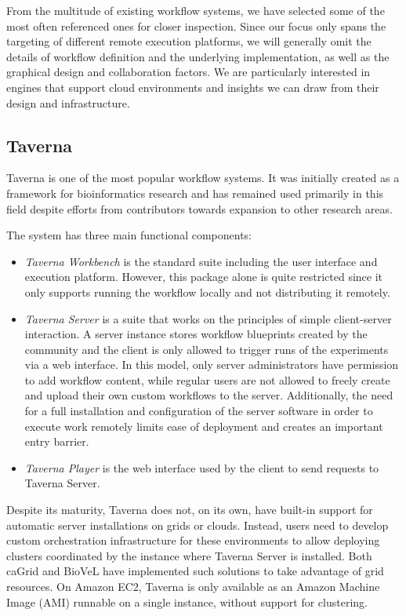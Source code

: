 \documentclass[11pt,a4paper]{report}
\begin{document}
From the multitude of existing workflow systems, we have selected some of the most often referenced ones for closer inspection. Since our focus only spans the targeting of different remote execution platforms, we will generally omit the details of workflow definition and the underlying implementation, as well as the graphical design and collaboration factors. We are particularly interested in engines that support cloud environments and insights we can draw from their design and infrastructure.

\subsection{Taverna}

Taverna \cite{Wolstencroft2013} is one of the most popular workflow systems. It was initially created as a framework for bioinformatics research and has remained used primarily in this field despite efforts from contributors towards expansion to other research areas.

The system has three main functional components:
\begin{itemize}
	\item \textit{Taverna Workbench} is the standard suite including the user interface and execution platform. However, this package alone is quite restricted since it only supports running the workflow locally and not distributing it remotely.
	\item \textit{Taverna Server} is a suite that works on the principles of simple client-server interaction. A server instance stores workflow blueprints created by the community and the client is only allowed to trigger runs of the experiments via a web interface. In this model, only server administrators have permission to add workflow content, while regular users are not allowed to freely create and upload their own custom workflows to the server. Additionally, the need for a full installation and configuration of the server software in order to execute work remotely limits ease of deployment and creates an important entry barrier.
	\item \textit{Taverna Player} is the web interface used by the client to send requests to Taverna Server.
\end{itemize}

Despite its maturity, Taverna does not, on its own, have built-in support for automatic server installations on grids or clouds. Instead, users need to develop custom orchestration infrastructure for these environments to allow deploying clusters coordinated by the instance where Taverna Server is installed. Both caGrid \cite{caGrid} and BioVeL \cite{BioVeL} have implemented such solutions \cite{TavernaGrid, Donvito} to take advantage of grid resources. On Amazon EC2, Taverna is only available as an Amazon Machine Image (AMI) runnable on a single instance, without support for clustering.
\end{document}
